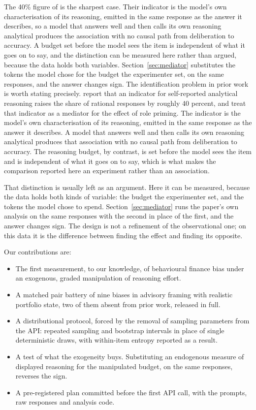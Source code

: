 \ifsubmission
The 40\% figure of \citet{bini2026behavioral} is the sharpest case. Their
indicator is the model's own characterisation of its reasoning, emitted in
the same response as the answer it describes, so a model that answers well
and then calls its own reasoning analytical produces the association with no
causal path from deliberation to accuracy. A budget set before the model sees
the item is independent of what it goes on to say, and the distinction can be
measured here rather than argued, because the data holds both variables.
Section~\ref{sec:mediator} substitutes the tokens the model chose for the
budget the experimenter set, on the same responses, and the answer changes
sign.
\else
The identification problem in prior work is worth stating precisely.
\citet{bini2026behavioral} report that an indicator for self-reported
analytical reasoning raises the share of rational responses by roughly 40
percent, and treat that indicator as a mediator for the effect of role
priming. The indicator is the model's own characterisation of its reasoning,
emitted in the same response as the answer it describes. A model that answers
well and then calls its own reasoning analytical produces that association
with no causal path from deliberation to accuracy. The reasoning budget, by
contrast, is set before the model sees the item and is independent of what it
goes on to say, which is what makes the comparison reported here an
experiment rather than an association.

That distinction is usually left as an argument. Here it can be measured,
because the data holds both kinds of variable: the budget the experimenter
set, and the tokens the model chose to spend. Section~\ref{sec:mediator}
runs the paper's own analysis on the same responses with the second in place
of the first, and the answer changes sign. The design is not a refinement of
the observational one; on this data it is the difference between finding the
effect and finding its opposite.
\fi

Our contributions are:
\begin{itemize}
  \item The first measurement, to our knowledge, of behavioural finance bias
        under an exogenous, graded manipulation of reasoning effort.
  \item A matched pair battery of nine biases in advisory framing with
        realistic portfolio state, two of them absent from prior work,
        released in full.
  \item A distributional protocol, forced by the removal of sampling
        parameters from the API: repeated sampling and bootstrap intervals in
        place of single deterministic draws, with within-item entropy
        reported as a result.
  \item A test of what the exogeneity buys. Substituting an endogenous
        measure of displayed reasoning for the manipulated budget, on the
        same responses, reverses the sign.
  \item A pre-registered plan committed before the first API call, with the
        prompts, raw responses and analysis code.
\end{itemize}


